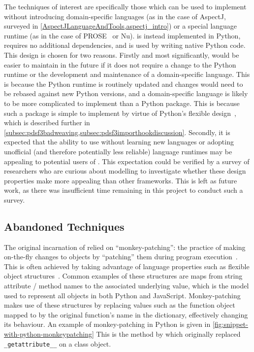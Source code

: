 The techniques of interest are specifically those which can be used to implement
\aop{} without introducing domain-specific languages (as in the case of AspectJ,
surveyed in \cref{AspectJLanguageAndTools,aspectj_intro}) or a special language
runtime (as in the case of PROSE~\cite{popovici2002PROSE} or
Nu\cite{rajan2006nu_towardsao_invocation}). \pdsf{} is instead implemented in
Python, requires no additional dependencies, and is used by writing native
Python code. This design is chosen for two reasons. Firstly and most
significantly, \pdsf{} would be easier to maintain in the future if it does not
require a change to the Python runtime or the development and maintenance of a
domain-specific language. This is because the Python runtime is routinely
updated and changes would need to be rebased against new Python versions, and a
domain-specific language is likely to be more complicated to implement than a
Python package. This is because such a package is simple to implement by virtue
of Python's flexible
design~\cite{advanced_python_monkey_patching,forbiddenfruit_repo}, which is
described further in
\cref{subsec:pdsf3badweaving,subsec:pdsf3importhookdiscussion}. Secondly, it is
expected that the ability to use \pdsf{} without learning new languages or
adopting unofficial (and therefore potentially less reliable) language runtimes
may be appealing to potential users of \aop{}. This expectation could be
verified by a survey of researchers who are curious about \aspectoriented{}
modelling to investigate whether these design properties make \pdsf{} more
appealing than other \aop{} frameworks. This is left as future work, as there
was insufficient time remaining in this project to conduct such a survey.


\subsection{Abandoned Techniques}\label{subsec:pdsf3badweaving}

The original incarnation of \pdsf{} relied on ``monkey-patching'': the practice
of making on-the-fly changes to objects by ``patching''
them during program execution~\cite{advanced_python_monkey_patching}. This is
often achieved by taking advantage of language properties such as flexible
object structures~\cite{advanced_python_monkey_patching}. Common examples of
these structures are maps from string attribute / method names to the associated
underlying value, which is the model used to represent all objects in both
Python and JavaScript. Monkey-patching makes use of these structures by
replacing values such as the function object mapped to by the original
function's name in the dictionary, effectively changing its behaviour. An
example of monkey-patching in Python is given in \cref{fig:snippet-with-python-monkeypatching} This is
the method by which \pdsf{} originally replaced \lstinline{_getattribute__} on a
class object.

